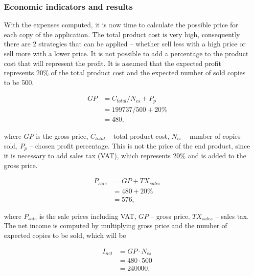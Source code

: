 \subsubsection{Economic indicators and results}
With the expenses computed, it is now time to calculate the possible price for each copy of the
application. The total product cost is very high, consequently there are 2 strategies that can be applied -- whether sell less with a high price or sell more with a lower price. It is not possible to add a percentage to the product cost that will represent the profit. It is assumed that the expected profit represents $20\%$ of the total product cost and the expected number of sold copies to be 500.

\begin{equation}
 \begin{split}
  GP &= C_{total} / N_{cs} + P_{p}\\
              &= 199737/500 + 20\% \\
              &= 480,
 \end{split}
\end{equation}

\noindent
where $GP$ is the gross price, $C_{total}$ -- total product cost, $N_{cs}$ -- number of copies sold, $P_{p}$ -- chosen profit percentage. This is not the price of the end product, since it is necessary to add sales tax (VAT), which represents $20\%$ and is added to the gross price. 

\begin{equation}
 \begin{split}
  P_{sale} &= GP + TX_{sales}\\
              &= 480 + 20\% \\
              &= 576,
 \end{split}
\end{equation}

\noindent
where $P_{sale}$ is the sale prices including VAT, $GP$ -- gross price, $TX_{sales}$ -- sales tax. The net income is computed by multiplying gross price and the number of expected copies to be sold, which will be

\begin{equation}
 \begin{split}
  I_{net} &= GP \cdot N_{cs}\\
              &= 480  \cdot 500 \\
              &= 240000,
 \end{split}
\end{equation}

